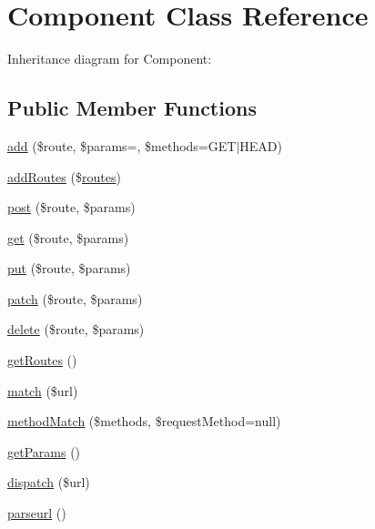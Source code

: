 \hypertarget{class_zest_1_1_component_1_1_component}{}\section{Component Class Reference}
\label{class_zest_1_1_component_1_1_component}


Inheritance diagram for Component\+:
\subsection*{Public Member Functions}
\begin{DoxyCompactItemize}
\item 
\mbox{\hyperlink{class_zest_1_1_component_1_1_component_ac897e899f8138035a0cffd811e66e511}{add}} (\$route, \$params=\textquotesingle{}\textquotesingle{}, \$methods=\textquotesingle{}G\+ET$\vert$H\+E\+AD\textquotesingle{})
\item 
\mbox{\hyperlink{class_zest_1_1_component_1_1_component_aaa3340c31a0589e86c4776ac12728380}{add\+Routes}} (\$\mbox{\hyperlink{class_zest_1_1_component_1_1routes}{routes}})
\item 
\mbox{\hyperlink{class_zest_1_1_component_1_1_component_aa429da1bb99f01f3cb6cb852bd5c6d1b}{post}} (\$route, \$params)
\item 
\mbox{\hyperlink{class_zest_1_1_component_1_1_component_a51dc358f1d8ce5d2e4029c45c2097890}{get}} (\$route, \$params)
\item 
\mbox{\hyperlink{class_zest_1_1_component_1_1_component_adf823f3a16fa82141c7933c7ae927f65}{put}} (\$route, \$params)
\item 
\mbox{\hyperlink{class_zest_1_1_component_1_1_component_a73c86b4094ed082a203f231dccd9bf61}{patch}} (\$route, \$params)
\item 
\mbox{\hyperlink{class_zest_1_1_component_1_1_component_a893e99daba2c70ee898cb9c89a8e5e81}{delete}} (\$route, \$params)
\item 
\mbox{\hyperlink{class_zest_1_1_component_1_1_component_a18da86bf318ebe47e501aaad267d59ed}{get\+Routes}} ()
\item 
\mbox{\hyperlink{class_zest_1_1_component_1_1_component_abd724f6a6c6ad25275026dede10a1495}{match}} (\$url)
\item 
\mbox{\hyperlink{class_zest_1_1_component_1_1_component_a732fd0dc552efc395b1ed94302359743}{method\+Match}} (\$methods, \$request\+Method=null)
\item 
\mbox{\hyperlink{class_zest_1_1_component_1_1_component_ae32cd7c32721b02d676bb63b4b1366db}{get\+Params}} ()
\item 
\mbox{\hyperlink{class_zest_1_1_component_1_1_component_aa1582e6a62dc40179f53a4a3705c044e}{dispatch}} (\$url)
\item 
\mbox{\hyperlink{class_zest_1_1_component_1_1_component_a7366d2dcd78903bd5baca0ec280d180e}{parseurl}} ()
\end{DoxyCompactItemize}

